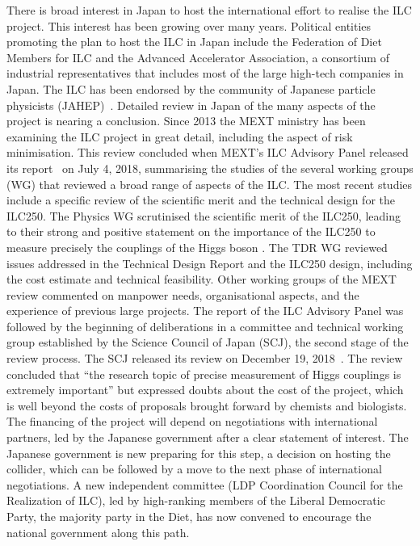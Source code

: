 There is broad interest in Japan to host the
international effort to realise the ILC project.  
This interest has been growing over many years.
Political entities promoting the plan to host the ILC in Japan include 
the Federation of Diet Members for ILC and the Advanced Accelerator
Association, a consortium of industrial representatives that includes
most of the large high-tech companies in Japan.   The ILC has been
endorsed by the community of Japanese particle physicists (JAHEP)~\cite{Asai:2017pwp}. 
Detailed review in Japan of the many aspects of the
project is nearing a conclusion.
Since 2013 the MEXT ministry has been examining the ILC project in
great detail, including the aspect of risk minimisation.
This review concluded when
MEXT's ILC Advisory Panel released 
its report~\cite{AdvPanel} on July 4, 2018, summarising the
studies of the several working groups (WG) that
reviewed 
a broad range of aspects of the ILC.  The most recent studies include
a specific review of the scientific merit and the technical design for the ILC250. 
The  Physics WG scrutinised the scientific merit of the ILC250,
leading to their strong and positive statement on the importance of
the ILC250 to 
measure precisely the couplings of the Higgs boson \cite{AdvPanel}.
The TDR WG reviewed issues addressed in the Technical Design Report
and the ILC250 design, including the  cost estimate and technical feasibility.  
Other working groups of the MEXT review commented on manpower needs, 
organisational aspects, and the experience of previous large projects.
The report of the ILC Advisory Panel was followed by the beginning of
deliberations in a committee and technical working group 
established by the Science Council of Japan (SCJ),
the second stage of the review process.   The SCJ released its review
on December 19, 2018~\cite{SJCreport}.   The review concluded that ``the research topic
of precise measurement of Higgs couplings is extremely important'' but
expressed doubts about the cost of the project, which is well beyond
the costs of proposals brought forward by chemists and biologists.
The financing of the project will depend on negotiations with
international partners, led by the Japanese government after a clear
statement of interest.   The Japanese government is new preparing for
this step, 
a decision on hosting the collider, which can be followed by a move to the next phase of international
negotiations.  A new  independent committee (LDP Coordination Council
for the Realization of ILC),
led by high-ranking members of the Liberal Democratic 
Party, the majority party in the Diet,  has now 
convened to encourage the national government along this path.

